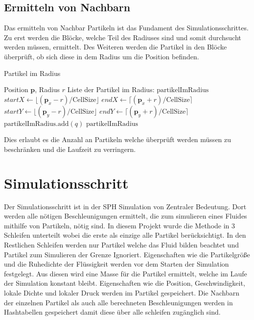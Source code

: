 \documentclass[a4paper, 12pt]{article}
\begin{document}
\subsection{Ermitteln von Nachbarn}
Das ermitteln von Nachbar Partikeln ist das Fundament des Simulationsschrittes. Zu erst werden die Blöcke, welche Teil des Radiuses sind und somit durchsucht werden müssen, ermittelt. Des Weiteren werden die Partikel in den Blöcke überprüft, ob sich diese in dem Radius um die Position befinden.
\begin{algorithm}[H]
    \caption{Partikel im Radius}
    \begin{algorithmic}[1]
		\Require Position $\mathbf{p}$, Radius $r$
        \Ensure Liste der Partikel im Radius: $\text{partikelImRadius}$
        \State $startX \leftarrow \lfloor (\mathbf{p}_x - r) / \text{CellSize} \rfloor$
        \State $endX \leftarrow \lceil (\mathbf{p}_x + r) / \text{CellSize} \rceil$
        \State $startY \leftarrow \lfloor (\mathbf{p}_y - r) / \text{CellSize} \rfloor$
        \State $endY \leftarrow \lceil (\mathbf{p}_y + r) / \text{CellSize} \rceil$
                            \State $\text{partikelImRadius}.\text{add}(q)$
                        \EndIf
                    \EndFor
                \EndIf
            \EndFor
        \EndFor
        \Return $\text{partikelImRadius}$
    \end{algorithmic}
\end{algorithm}
Dies erlaubt es die Anzahl an Partikeln welche überprüft werden müssen zu beschränken und die Laufzeit zu verringern. 

\section{Simulationsschritt} \label{Kap:Simulationsschritt}
Der Simulationsschritt ist in der SPH Simulation von Zentraler Bedeutung. Dort werden alle nötigen Beschleunigungen ermittelt, die zum simulieren eines Fluides mithilfe von Partikeln, nötig sind. In diesem Projekt wurde die Methode in 3 Schleifen unterteilt wobei die erste als einzige alle Partikel berücksichtigt. In den Restlichen Schleifen werden nur Partikel welche das Fluid bilden beachtet und Partikel zum Simulieren der Grenze Ignoriert. Eigenschaften wie die Partikelgröße und die Ruhedichte der Flüssigkeit werden vor dem Starten der Simulation festgelegt. Aus diesen wird eine Masse für die Partikel ermittelt, welche im Laufe der Simulation konstant bleibt. Eigenschaften wie die Position, Geschwindigkeit, lokale Dichte und lokaler Druck werden im Partikel gespeichert. Die Nachbarn der einzelnen Partikel als auch alle berechneten Beschleunigungen werden in Hashtabellen gespeichert damit diese über alle schleifen zugänglich sind.
\end{document}
